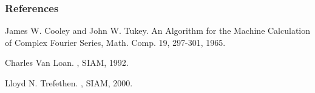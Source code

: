 \documentclass[mathserif,notes]{beamer} %
\begin{document}
\begin{frame}[allowframebreaks]
  \frametitle<presentation>{References}    
  \begin{thebibliography}{10}    

     
     \beamertemplatearticlebibitems
 James W. Cooley and John W. Tukey.
  \newblock An Algorithm for the Machine Calculation of Complex Fourier Series,
 \newblock Math. Comp. 19, 297-301, 1965. 

  \beamertemplatebookbibitems
   Charles Van Loan.
    ,
   \newblock SIAM,  1992.

     
       \beamertemplatebookbibitems
   Lloyd N. Trefethen.
    ,
   \newblock SIAM, 2000.
     \beamertemplatearticlebibitems
  \end{thebibliography}
 \end{frame}
 
\end{document}

